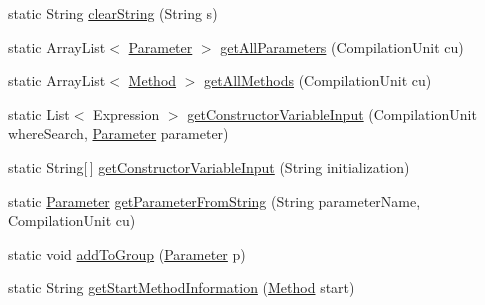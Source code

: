 \begin{DoxyCompactItemize}
\item 
static String \hyperlink{classit_1_1isislab_1_1masonassisteddocumentation_1_1mason_1_1analizer_1_1_global_utility_a56635a5ae634c04b2a8ae186bb1cada8}{clear\-String} (String s)
\item 
static Array\-List$<$ \hyperlink{classit_1_1isislab_1_1masonassisteddocumentation_1_1mason_1_1analizer_1_1_parameter}{Parameter} $>$ \hyperlink{classit_1_1isislab_1_1masonassisteddocumentation_1_1mason_1_1analizer_1_1_global_utility_abd9cd8d87961f84bb2b7b865e8047a1f}{get\-All\-Parameters} (Compilation\-Unit cu)
\item 
static Array\-List$<$ \hyperlink{classit_1_1isislab_1_1masonassisteddocumentation_1_1mason_1_1analizer_1_1_method}{Method} $>$ \hyperlink{classit_1_1isislab_1_1masonassisteddocumentation_1_1mason_1_1analizer_1_1_global_utility_a30195b9f55f1c7dd574b09d3d9a65995}{get\-All\-Methods} (Compilation\-Unit cu)
\item 
static List$<$ Expression $>$ \hyperlink{classit_1_1isislab_1_1masonassisteddocumentation_1_1mason_1_1analizer_1_1_global_utility_a7bc538804e8d1aebf335e599cb3a26d8}{get\-Constructor\-Variable\-Input} (Compilation\-Unit where\-Search, \hyperlink{classit_1_1isislab_1_1masonassisteddocumentation_1_1mason_1_1analizer_1_1_parameter}{Parameter} parameter)
\item 
static String\mbox{[}$\,$\mbox{]} \hyperlink{classit_1_1isislab_1_1masonassisteddocumentation_1_1mason_1_1analizer_1_1_global_utility_a906bb4b6c8af20f38210f87687019020}{get\-Constructor\-Variable\-Input} (String initialization)
\item 
static \hyperlink{classit_1_1isislab_1_1masonassisteddocumentation_1_1mason_1_1analizer_1_1_parameter}{Parameter} \hyperlink{classit_1_1isislab_1_1masonassisteddocumentation_1_1mason_1_1analizer_1_1_global_utility_aed7713e549a92beeb05b273f3ad80ff7}{get\-Parameter\-From\-String} (String parameter\-Name, Compilation\-Unit cu)
\item 
static void \hyperlink{classit_1_1isislab_1_1masonassisteddocumentation_1_1mason_1_1analizer_1_1_global_utility_ac315e13a457f7bbc76e79f1c91a2c108}{add\-To\-Group} (\hyperlink{classit_1_1isislab_1_1masonassisteddocumentation_1_1mason_1_1analizer_1_1_parameter}{Parameter} p)
\item 
static String \hyperlink{classit_1_1isislab_1_1masonassisteddocumentation_1_1mason_1_1analizer_1_1_global_utility_a6d16240bc63e06841fef3d7f5343d9ef}{get\-Start\-Method\-Information} (\hyperlink{classit_1_1isislab_1_1masonassisteddocumentation_1_1mason_1_1analizer_1_1_method}{Method} start)

\end{DoxyCompactItemize}
